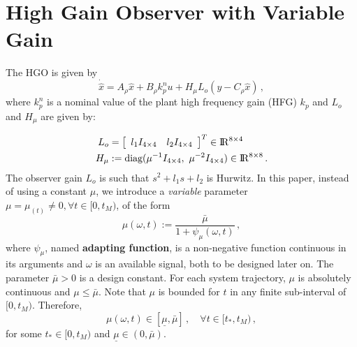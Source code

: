 \documentclass[letterpaper, 10 pt, conference]{ieeeconf}  %
\def\re{{\rm I}\! {\rm R}}
\theoremstyle{plain}
\theoremstyle{definition}
\theoremstyle{remark}
\newtheorem*{remark}{Remark}
\begin{document}
\section{High Gain Observer with Variable Gain}
\label{sec:HGO}

The HGO \cite{Khalil2008} is given by
%
\begin{equation}
\dot{\hat{x}}=A_\rho \hat{x} +  B_\rho k_p^n u +H_\mu L_o (y-C_\rho
\hat{x})\,,\label{eq:reducedHGO}
\end{equation}
%
where $k_p^n$ is a nominal value of the plant high frequency gain (HFG) $k_p$ and $L_o$ and $H_\mu$ are given by:

%
\begin{subequations}
	\label{eq:defLhgo_and_Hhgo}
	\begin{align}
		L_o &= \left[\begin{array}{cc}  l_1 I_{4 \times 4} & l_2 I_{4 \times 4} \end{array} \right]^T \in \re^{8 \times 4} 
		\\
		H_\mu &:= \mbox{diag}(\mu^{-1}  I_{4 \times 4}, \ \mu^{-2} I_{4 \times 4}) \in \re^{8 \times 8}\,.
	\end{align}
\end{subequations}
%
%
%
The observer gain $L_o$ is such that $s^{2}+l_1
s+ l_2$ is Hurwitz. In this paper,
instead of using a constant $\mu$, we introduce a {\em variable}
parameter $\mu=\mu_(t)\neq\!0, \forall t\in[0,t_M)$, %
of the form
%
\begin{equation}
\mu(\omega,t):=\frac{\bar{\mu}}{1+
\psi_\mu(\omega,t)}\,,\label{eq:def_mu}
\end{equation}
%
where $\psi_\mu$, named \textbf{adapting function}, is a
non-negative function continuous in its
arguments and $\omega$ is an available signal, both to be designed later on. The parameter $\bar{\mu}\!>\!0$ is a design constant. For each
system trajectory, $\mu$ is absolutely continuous and
$\mu\!\leq\!\bar{\mu}$. Note that $\mu$ is bounded for $t$ in any
finite sub-interval of $[0,t_M)$. Therefore,
%
\begin{equation}
\mu(\omega,t)\in[\underline{\mu},\bar{\mu}]\,, \quad \forall
t\!\in\![t_*,t_M)\,, \label{eq:P3}
\end{equation}
%
for some $t_* \in [0,t_M)$ and
$\underline{\mu}\!\in\!(0,\bar{\mu})$. 
\end{document}
